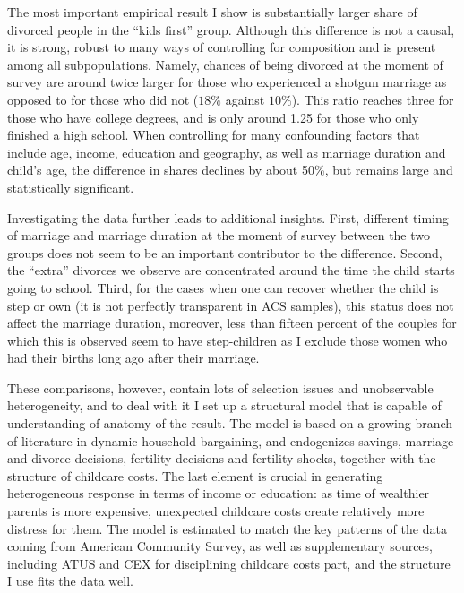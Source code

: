 \documentclass[12pt,letter]{article}
\begin{document}
The most important empirical result I show is substantially larger share of divorced people in the ``kids first'' group. Although this difference is not a causal, it is strong, robust to many ways of controlling for composition and is present among all subpopulations. Namely, chances of being divorced at the moment of survey are around twice larger for those who experienced a shotgun marriage as opposed to for those who did not ($18\%$ against $10\%$). This ratio reaches three for those who have college degrees, and is only around 1.25 for those who only finished a high school. When controlling for many confounding factors that include age, income, education and geography, as well as marriage duration and child's age, the difference in shares declines by about 50\%, but remains large and statistically significant.  %

Investigating the data further leads to additional insights. First, different timing of marriage and marriage duration at the moment of survey between the two groups does not seem to be an important contributor to the difference. Second, the ``extra'' divorces we observe are concentrated around the time the child starts going to school. Third, for the cases when one can recover whether the child is step or own (it is not perfectly transparent in ACS samples), this status does not affect the marriage duration, moreover, less than fifteen percent of the couples for which this is observed seem to have step-children as I exclude those women who had their births long ago after their marriage. %

These comparisons, however, contain lots of selection issues and unobservable heterogeneity, and to deal with it I set up a structural model that is capable of understanding of anatomy of the result. The model is based on a growing branch of literature in dynamic household bargaining, and endogenizes savings, marriage and divorce decisions, fertility decisions and fertility shocks, together with the structure of childcare costs. The last element is crucial in generating heterogeneous response in terms of income or education: as time of wealthier parents is more expensive, unexpected childcare costs create relatively more distress for them. The model is estimated to match the key patterns of the data coming from American Community Survey, as well as supplementary sources, including ATUS and CEX for disciplining childcare costs part, and the structure I use fits the data well.
\end{document}
